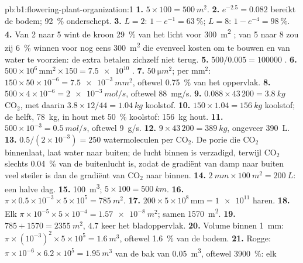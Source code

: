 \begin{solution}{pb:b1:flowering-plant-organization:1}
\textbf{1.} $5\times 100 = \qty{500}{m^2}$.
\textbf{2.} $e^{-2.5} = 0.082$ bereikt de bodem; \qty{92}{\%}
onderschept.
\textbf{3.} $L = 2$: $1 - e^{-1} = \qty{63}{\%}$; $L = 8$: $1 -
e^{-4} = \qty{98}{\%}$.
\textbf{4.} Van 2 naar 5 wint de kroon \qty{29}{\%} van het licht voor
\qty{300}{m^2} ; van 5 naar 8 zou zij \qty{6}{\%} winnen voor nog
eens \qty{300}{m^2} die evenveel kosten om te bouwen en van water te
voorzien: de extra  betalen zichzelf niet terug.
\textbf{5.} $500/0.005 = \num{100000}$ .
\textbf{6.} $500\times 10^6\,\mathrm{mm^2}\times 150 = \num{7.5e10}$
.
\textbf{7.} $\qty{50}{\micro m^2}$; per mm$^2$: $150\times 50\times
10^{-6} = \qty{7.5e-3}{mm^2}$, oftewel \qty{0.75}{\%} van het oppervlak.
\textbf{8.} $500\times 4\times 10^{-6} = \qty{2e-3}{mol/s}$, oftewel
\qty{88}{mg/s}.
\textbf{9.} $0.088\times 43\,200 = \qty{3.8}{kg}$ $\mathrm{CO_2}$,
met daarin $3.8\times 12/44 = \qty{1.04}{kg}$ koolstof.
\textbf{10.} $150\times 1.04 = \qty{156}{kg}$ koolstof; de helft,
\qty{78}{kg}, in hout met \qty{50}{\%} koolstof: \qty{156}{kg} hout.
\textbf{11.} $500\times 10^{-3} = \qty{0.5}{mol/s}$, oftewel \qty{9}{g/s}.
\textbf{12.} $9\times 43\,200 = \qty{389}{kg}$, ongeveer \qty{390}{L}.
\textbf{13.} $0.5/(2\times 10^{-3}) = 250$ watermoleculen per
$\mathrm{CO_2}$. De porie die $\mathrm{CO_2}$ binnenlaat, laat water naar
buiten; de lucht binnen is verzadigd, terwijl $\mathrm{CO_2}$ slechts
\qty{0.04}{\%} van de buitenlucht is, zodat de gradiënt van damp naar buiten
veel steiler is dan de gradiënt van $\mathrm{CO_2}$ naar binnen.
\textbf{14.} $\qty{2}{mm}\times\qty{100}{m^2} = \qty{200}{L}$: een halve
dag.
\textbf{15.} \qty{100}{m^3}; $5\times 100 = \qty{500}{km}$.
\textbf{16.} $\pi\times 0.5\times 10^{-3}\times 5\times 10^5 =
\qty{785}{m^2}$.
\textbf{17.} $200\times 5\times 10^8\,\mathrm{mm} = \num{1e11}$ haren.
\textbf{18.} Elk $\pi\times 10^{-5}\times 5\times 10^{-4} =
\qty{1.57e-8}{m^2}$; samen \qty{1570}{m^2}.
\textbf{19.} $785 + 1570 = \qty{2355}{m^2}$, $4.7$ keer het bladoppervlak.
\textbf{20.} Volume binnen \qty{1}{mm}: $\pi\times(10^{-3})^2\times 5
\times 10^5 = \qty{1.6}{m^3}$, oftewel \qty{1.6}{\%} van de bodem.
\textbf{21.} Rogge: $\pi\times 10^{-6}\times 6.2\times 10^5 =
\qty{1.95}{m^3}$ van de bak van \qty{0.05}{m^3}, oftewel \qty{3900}{\%}: elk

\end{solution}
